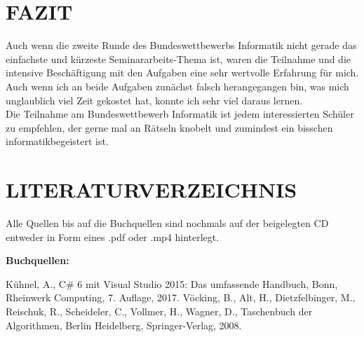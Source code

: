 \documentclass[a4paper,12pt]{article}
\begin{document}
\newpage
\section{FAZIT}
Auch wenn die zweite Runde des Bundeswettbewerbs Informatik nicht gerade das einfachste und kürzeste Seminararbeits-Thema ist, waren die Teilnahme und die intensive Beschäftigung mit den Aufgaben eine sehr wertvolle Erfahrung für mich.
\\[0.4cm]
Auch wenn ich an beide Aufgaben zunächst falsch herangegangen bin, was mich unglaublich viel Zeit gekostet hat, konnte ich sehr viel daraus lernen.
\\[0.4cm]
Die Teilnahme am Bundeswettbewerb Informatik ist jedem interessierten Schüler zu empfehlen, der gerne mal an Rätseln knobelt und zumindest ein bisschen informatikbegeistert ist.



\newpage
\section{LITERATURVERZEICHNIS}
Alle Quellen bis auf die Buchquellen sind nochmals auf der beigelegten CD entweder in Form eines .pdf oder .mp4 hinterlegt.
\vspace{1cm}

\begingroup
\renewcommand{\section}[2]{}%
\begin{large}
\textbf{Buchquellen:}
\end{large}

\begin{thebibliography}{9}

      Kühnel, A.,
      C\# 6 mit Visual Studio 2015: Das umfassende Handbuch,
      Bonn, Rheinwerk Computing,
      7. Auflage,
      2017.
      Vöcking, B., Alt, H., Dietzfelbinger, M., Reischuk, R., Scheideler, C., Vollmer, H., Wagner, D.,
      Taschenbuch der Algorithmen,
      Berlin Heidelberg, Springer-Verlag,
      2008.

\end{thebibliography}
\end{document}
